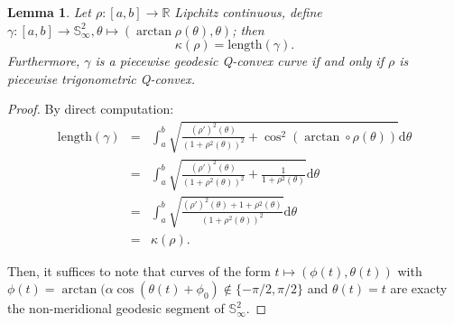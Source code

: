 \documentclass[a4paper,12pt]{article}
\def\d{\mathrm{d}}
\def\RR{\mathbb{R}}
\def\SS{\mathbb{S}}
\def\d{\mathrm{d}}
\newtheorem{lem}{Lemma}[section]		 %
\theoremstyle{definition}
\begin{document}
					\begin{lem} \label{lem:stalk_to_geodesic}
						Let $\rho: [a,b]\rightarrow \RR$ Lipchitz continuous, define 
						$\gamma: [a,b]\rightarrow \SS^2_\infty,\theta \mapsto (\arctan \rho(\theta),\theta)$;
						then
						$$\kappa(\rho)=\mathrm{length}(\gamma).$$
						  Furthermore, $\gamma$ is a piecewise geodesic Q-convex curve if and only if $\rho$ is piecewise trigonometric Q-convex.
					\end{lem}
					\begin{proof} 
					  By direct computation: \begin{eqnarray*}\mathrm{length}(\gamma)&=&\int_a^b \sqrt{\frac{(\rho')^2(\theta)}{(1+\rho^2(\theta))^2}+\cos^2(\arctan\circ \rho(\theta)) }\d \theta \\
					 &=& \int_a^b \sqrt{\frac{(\rho')^2(\theta)}{(1+\rho^2(\theta))^2}+\frac{1}{1+
					 \rho^2(\theta)} }\d \theta \\
					 &=& \int_a^b \sqrt{\frac{(\rho')^2(\theta)+1+\rho^2(\theta)}{(1+\rho^2(\theta))^2} }\d \theta \\
					 &=& \kappa(\rho).
					 \end{eqnarray*}

					 Then, it suffices to note that curves of the form $t\mapsto (\phi(t),\theta(t))$ with $\phi(t)= \arctan(\alpha\cos(\theta(t)+\phi_0) \notin \{-\pi/2,\pi/2\}$ and $\theta(t)=t$ are exacty the non-meridional geodesic segment of $\SS^2_\infty$.
					\end{proof}
					
\end{document}
